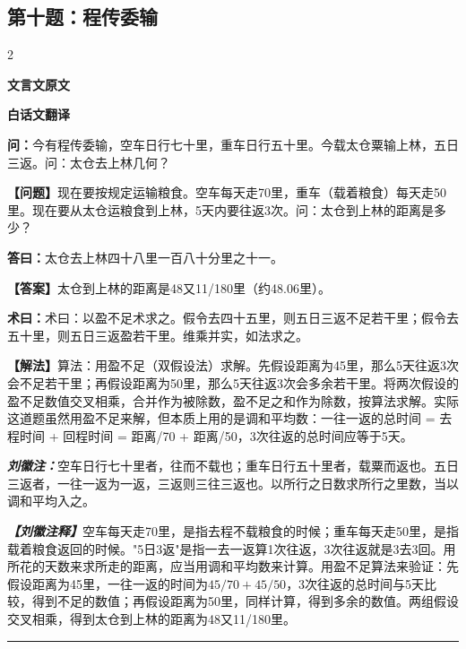 \documentclass[10pt,a4paper]{article}
\newcommand{\wen}[1]{\textbf{\color{problemcolor}问：}#1\par}
\newcommand{\da}[1]{\textbf{答曰：}#1\par}
\newcommand{\shu}[1]{\textbf{术曰：}#1\par}
\newcommand{\liuhui}[1]{{\color{commentarycolor}\textit{\textbf{刘徽注：}}#1\par}}
\newcommand{\classicalheader}[1]{{\centering\large\bfseries\color{classicalcolor} #1\par\vspace{0.5em}}}
\newcommand{\wenmodern}[1]{\textbf{\color{moderncolor}【问题】}#1\par}
\newcommand{\damodern}[1]{\textbf{【答案】}#1\par}
\newcommand{\shumodern}[1]{\textbf{【解法】}#1\par}
\newcommand{\liuhuimodern}[1]{{\color{commentarycolor}\textit{\textbf{【刘徽注释】}}#1\par}}
\newcommand{\modernheader}[1]{{\centering\large\bfseries\color{moderncolor} #1\par\vspace{0.5em}}}
\newcommand{\problemsec}[1]{\subsection*{#1}}
\begin{document}
\problemsec{第十题：程传委输}
\begin{paracol}{2}
\classicalheader{文言文原文}
\switchcolumn
\modernheader{白话文翻译}
\switchcolumn*

\wen{今有程传委输，空车日行七十里，重车日行五十里。今载太仓粟输上林，五日三返。问：太仓去上林几何？}

\switchcolumn

\wenmodern{现在要按规定运输粮食。空车每天走70里，重车（载着粮食）每天走50里。现在要从太仓运粮食到上林，5天内要往返3次。问：太仓到上林的距离是多少？}

\switchcolumn*

\da{太仓去上林四十八里一百八十分里之十一。}

\switchcolumn

\damodern{太仓到上林的距离是48又11/180里（约48.06里）。}

\switchcolumn*

\shu{术曰：以盈不足术求之。假令去四十五里，则五日三返不足若干里；假令去五十里，则五日三返盈若干里。维乘并实，如法求之。}

\switchcolumn

\shumodern{算法：用盈不足（双假设法）求解。先假设距离为45里，那么5天往返3次会不足若干里；再假设距离为50里，那么5天往返3次会多余若干里。将两次假设的盈不足数值交叉相乘，合并作为被除数，盈不足之和作为除数，按算法求解。实际这道题虽然用盈不足来解，但本质上用的是调和平均数：一往一返的总时间 = 去程时间 + 回程时间 = 距离/70 + 距离/50，3次往返的总时间应等于5天。}

\switchcolumn*

\liuhui{空车日行七十里者，往而不载也；重车日行五十里者，载粟而返也。五日三返者，一往一返为一返，三返则三往三返也。以所行之日数求所行之里数，当以调和平均入之。}

\switchcolumn

\liuhuimodern{空车每天走70里，是指去程不载粮食的时候；重车每天走50里，是指载着粮食返回的时候。"5日3返"是指一去一返算1次往返，3次往返就是3去3回。用所花的天数来求所走的距离，应当用调和平均数来计算。用盈不足算法来验证：先假设距离为45里，一往一返的时间为$45/70+45/50$，3次往返的总时间与5天比较，得到不足的数值；再假设距离为50里，同样计算，得到多余的数值。两组假设交叉相乘，得到太仓到上林的距离为48又11/180里。}

\end{paracol}

\vspace{0.3cm}
\hrule
\vspace{0.3cm}
\end{document}
